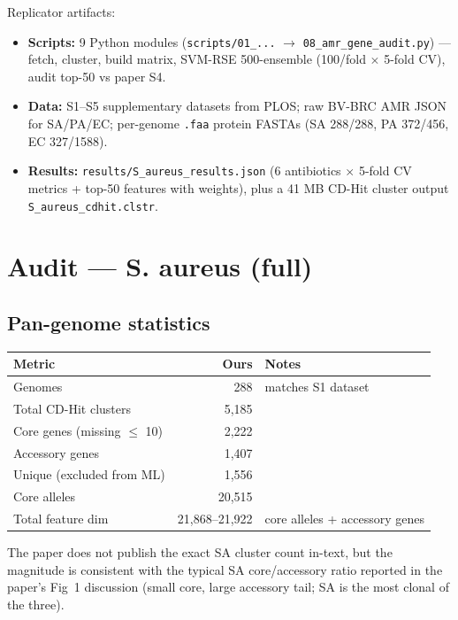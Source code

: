 \documentclass[11pt]{article}
\begin{document}
Replicator artifacts:
\begin{itemize}
  \item \textbf{Scripts:} 9 Python modules (\texttt{scripts/01\_...} $\to$ \texttt{08\_amr\_gene\_audit.py}) --- fetch, cluster, build matrix, SVM-RSE 500-ensemble (100/fold $\times$ 5-fold CV), audit top-50 vs paper S4.
  \item \textbf{Data:} S1--S5 supplementary datasets from PLOS; raw BV-BRC AMR JSON for SA/PA/EC; per-genome \texttt{.faa} protein FASTAs (SA 288/288, PA 372/456, EC 327/1588).
  \item \textbf{Results:} \texttt{results/S\_aureus\_results.json} (6 antibiotics $\times$ 5-fold CV metrics + top-50 features with weights), plus a 41 MB CD-Hit cluster output \texttt{S\_aureus\_cdhit.clstr}.
\end{itemize}

\section{Audit --- S. aureus (full)}

\subsection{Pan-genome statistics}
\begin{center}
\begin{tabular}{lrl}
\toprule
\textbf{Metric} & \textbf{Ours} & \textbf{Notes} \\
\midrule
Genomes & 288 & matches S1 dataset \\
Total CD-Hit clusters & 5{,}185 & \\
Core genes (missing $\leq$ 10) & 2{,}222 & \\
Accessory genes & 1{,}407 & \\
Unique (excluded from ML) & 1{,}556 & \\
Core alleles & 20{,}515 & \\
Total feature dim & 21{,}868--21{,}922 & core alleles + accessory genes \\
\bottomrule
\end{tabular}
\end{center}

The paper does not publish the exact SA cluster count in-text, but the magnitude is consistent with the typical SA core/accessory ratio reported in the paper's Fig~1 discussion (small core, large accessory tail; SA is the most clonal of the three).
\end{document}
